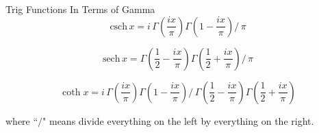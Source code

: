 \documentclass[12pt]{article}
\begin{document}
\begin{section}{Trig Functions In Terms of Gamma}
	\begin{equation}
		\text{csch}\,x=i\,\Gamma\left(\dfrac{ix}\pi\right)\Gamma\left(1-\dfrac{ix}\pi\right)\big/\,\pi
	\end{equation}

	\begin{equation}
		\text{sech}\,x=\Gamma\left(\dfrac12-\dfrac{ix}\pi\right)\Gamma\left(\dfrac12+\dfrac{ix}\pi\right)\big/\,\pi
	\end{equation}

	\begin{equation}
		\coth x=i\,\Gamma\left(\dfrac{ix}\pi\right)\Gamma\left(1-\dfrac {ix}\pi\right)\big/\,\Gamma\left(\dfrac12-\dfrac {ix}\pi\right)\Gamma\left(\dfrac12+\dfrac{ix}\pi\right)
	\end{equation}

	\noindent where ``$\big/$" means divide everything on the left by everything on the right.
\end{section}
\end{document}
